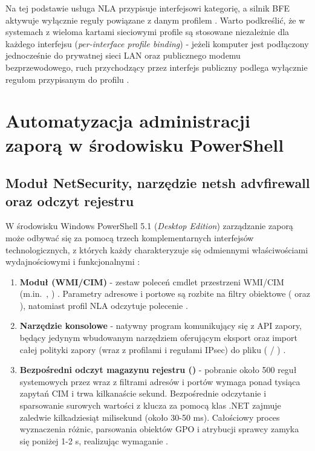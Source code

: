 Na tej podstawie usługa NLA przypisuje interfejsowi kategorię, a silnik BFE aktywuje wyłącznie reguły powiązane z danym profilem \cite{ms-wfp}. Warto podkreślić, że w systemach z wieloma kartami sieciowymi profile są stosowane niezależnie dla każdego interfejsu (\textit{per-interface profile binding}) - jeżeli komputer jest podłączony jednocześnie do prywatnej sieci LAN oraz publicznego modemu bezprzewodowego, ruch przychodzący przez interfejs publiczny podlega wyłącznie regułom przypisanym do profilu .

\section{Automatyzacja administracji zaporą w środowisku PowerShell}\label{sec:automatyzacja-powershell}

\subsection{Moduł NetSecurity, narzędzie netsh advfirewall oraz odczyt rejestru}\label{subsec:modul-netsecurity}

W środowisku Windows PowerShell 5.1 (\textit{Desktop Edition}) zarządzanie zaporą może odbywać się za pomocą trzech komplementarnych interfejsów technologicznych, z których każdy charakteryzuje się odmiennymi właściwościami wydajnościowymi i funkcjonalnymi \cite{ms-netsecurity-module, ms-netsh-advfirewall}:

\begin{enumerate}
    \item \textbf{Moduł  (WMI/CIM)} - zestaw poleceń cmdlet przestrzeni WMI/CIM (m.in.\ , ) \cite{ms-new-netfirewallrule}. Parametry adresowe i portowe są rozbite na filtry obiektowe ( oraz ), natomiast profil NLA odczytuje polecenie .
    \item \textbf{Narzędzie konsolowe } - natywny program komunikujący się z API zapory, będący jedynym wbudowanym narzędziem oferującym eksport oraz import całej polityki zapory (wraz z profilami i regułami IPsec) do pliku  ( / ) \cite{ms-netsh-advfirewall}.
    \item \textbf{Bezpośredni odczyt magazynu rejestru ()} - pobranie około 500 reguł systemowych przez  wraz z filtrami adresów i portów wymaga ponad tysiąca zapytań CIM i trwa kilkanaście sekund. Bezpośrednie odczytanie i sparsowanie surowych wartości z klucza  za pomocą klas .NET zajmuje zaledwie kilkadziesiąt milisekund (około 30-50 ms). Całościowy proces wyznaczenia różnic, parsowania obiektów GPO i atrybucji sprawcy zamyka się poniżej 1-2 s, realizując wymaganie .
\end{enumerate}

